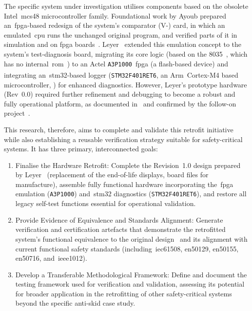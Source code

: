 The specific system under investigation utilises components based on the obsolete Intel~\gls{mcs48} microcontroller family. Foundational work by Ayoub prepared an~\gls{fpga}-based redesign of the system's comparator (V-) card, in which an emulated~\gls{cpu} runs the unchanged original program, and verified parts of it in simulation and on \gls{fpga} boards~\cite{ayoub2014}. Leyer~\cite{leyer2023} extended this emulation concept to the system's test-diagnosis board, migrating its core logic (based on the 8035~\cite{leyer2023ppt}, which has no internal~\gls{rom}~\cite[p.~1-1]{intel_mcs48_1978}) to an Actel \texttt{A3P1000}~\gls{fpga} (a flash-based device) and integrating an~\gls{stm32}-based logger (\texttt{STM32F401RET6}, an Arm\textsuperscript{\textregistered}~Cortex\textsuperscript{\textregistered}-M4 based microcontroller, ) for enhanced diagnostics. However, Leyer's prototype hardware (Rev~0.0) required further refinement and debugging to become a robust and fully operational platform, as documented in~\cite[Sec.~9.2]{leyer2023} and confirmed by the follow-on project~\cite[pp.~13--14]{savchuk2025}.

This research, therefore, aims to complete and validate this retrofit initiative while also establishing a reusable verification strategy suitable for safety-critical systems. It has three primary, interconnected goals:
\begin{enumerate}[label=\arabic*.]
	\item Finalise the Hardware Retrofit: Complete the Revision~1.0 design prepared by Leyer~\cite{leyer2023} (replacement of the end-of-life displays, board files for manufacture), assemble fully functional hardware incorporating the~\gls{fpga} emulation (\texttt{A3P1000}) and~\gls{stm32} diagnostics (\texttt{STM32F401RET6}), and restore all legacy self-test functions essential for operational validation.
	\item Provide Evidence of Equivalence and Standards Alignment: Generate verification and certification artefacts that demonstrate the retrofitted system's functional equivalence to the original design~\cite{rexroth1992wsp} and its alignment with current functional safety standards (including~\gls{iec61508}, \gls{en50129}, \gls{en50155}, \gls{en50716}, and~\gls{ieee1012}).
	\item Develop a Transferable Methodological Framework: Define and document the testing framework used for verification and validation, assessing its potential for broader application in the retrofitting of other safety-critical systems beyond the specific anti-skid case study.
\end{enumerate}

